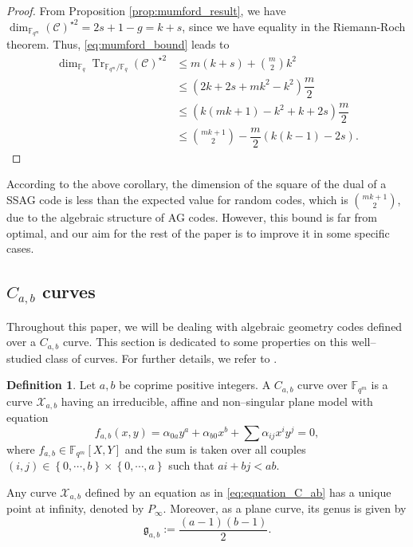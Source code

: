 \documentclass[a4paper]{article}
\theoremstyle{definition}
\newtheorem{definition}[thm]{Definition}
\theoremstyle{remark}
\newcommand{\calC}{\mathcal{C}}
\newcommand{\calX}{\mathcal{X}}
\newcommand{\fqm}{\mathbb{F}_{q^m}}
\newcommand{\fq}{\mathbb{F}_{q}}
\newcommand{\Tr}[1]{\operatorname{Tr}_{\mathbb{F}_{q^m}/\fq}\left(#1\right)}
\newcommand{\set}[1]{\left\{#1\right\}}
\begin{document}
\begin{proof}
 From Proposition \ref{prop:mumford_result}, we have $\dim_{\fqm}(\calC)^{\star2} = 2s+1-g = k+s$, since we have equality in the Riemann-Roch theorem. Thus, \eqref{eq:mumford_bound} leads to
 \begin{align*}
  \dim_{\fq}\Tr{\calC}^{\star2} &\leq m(k+s) + \binom{m}{2}k^2 \\
  &\leq (2k+2s+mk^2-k^2) \dfrac{m}{2} \\
  &\leq (k(mk+1)-k^2+k+2s) \dfrac{m}{2} \\
  &\leq \binom{mk+1}{2} - \dfrac{m}{2}(k(k-1)-2s) .
 \end{align*}
\end{proof}

According to the above corollary, the dimension of the square of the dual of a SSAG code is less than the expected value for random codes, which is $\binom{mk+1}{2}$, due to the algebraic structure of AG codes. However, this bound is far from optimal, and our aim for the rest of the paper is to improve it in some specific cases.

\subsection{$C_{a,b}$ curves} \label{section:C_a,b_codes}
Throughout this paper, we will be dealing with algebraic geometry codes defined over a $C_{a,b}$ curve. This section is dedicated to some properties on this well--studied class of curves. For further details, we refer to \cite{Miu93}. 

\begin{definition} \label{def:C_ab_curves} 
Let $a,b$ be coprime positive integers. A $C_{a,b}$ curve over $\fqm$ is a curve $\calX_{a,b}$ having an irreducible, affine and non--singular plane model with equation
\begin{equation} \label{eq:equation_C_ab}
f_{a,b}(x,y) = \alpha_{0a}y^a + \alpha_{b0}x^b + \sum \alpha_{ij}x^iy^j = 0,
\end{equation}
where $f_{a,b} \in \fqm[X,Y]$ and the sum is taken over all couples $(i,j) \in \set{0,\cdots,b} \times \set{0,\cdots,a}$ such that $ai+bj < ab$.
\end{definition}
Any curve $\calX_{a,b}$ defined by an equation as in \eqref{eq:equation_C_ab} has a unique point at infinity, denoted by $P_{\infty}$. Moreover, as a plane curve, its genus is given by
\[\mathfrak{g}_{a,b}:=\dfrac{(a-1)(b-1)}{2}.\]
\end{document}
